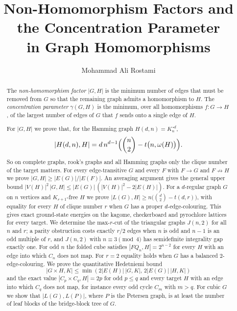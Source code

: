 \documentclass{article}
\title{Non-Homomorphism Factors and the Concentration Parameter\\
       in Graph Homomorphisms}
\author{Mohammad Ali Rostami}
\theoremstyle{definition}
\begin{document}
\maketitle

\begin{abstract}\sloppy
The \emph{non-homomorphism factor} $|G,H|$ is the minimum number of edges that
must be removed from $G$ so that the remaining graph admits a homomorphism to
$H$.  The \emph{concentration parameter} $\gamma(G,H)$ is the minimum, over all
homomorphisms $f\colon G\to H$, of the largest number of edges of $G$ that $f$
sends onto a single edge of $H$.

For $|G,H|$ we prove that, for the Hamming graph $H(d,n)=K_n^{\,\square d}$,
\[|H(d,n),H|=d\,n^{d-1}\Bigl(\binom n2-t\bigl(n,\omega(H)\bigr)\Bigr).\]
So on complete graphs, rook's graphs and all Hamming graphs only the clique
number of the target matters.  For every edge-transitive
$G$ and every $F$ with $F\to G$ and $F\not\to H$ we prove
$|G,H|\ge|E(G)|/|E(F)|$.  An averaging argument gives the general upper bound
$|V(H)|^2\,|G,H|\le|E(G)|\,(|V(H)|^2-2|E(H)|)$.  For a $d$-regular graph $G$ on $n$
vertices and $K_{r+1}$-free $H$ we prove $|L(G),H|\ge n\bigl(\binom d2-t(d,r)\bigr)$,
with equality for every $H$ of clique number $r$ when $G$ has a proper
$d$-edge-colouring.  This gives exact ground-state energies on the kagome,
checkerboard and pyrochlore lattices for every target.  We determine the max-$r$-cut of the triangular graphs $J(n,2)$ for all $n$ and
$r$; a parity obstruction costs exactly $r/2$ edges when $n$ is odd and $n-1$ is an
odd multiple of $r$, and $J(n,2)$ with $n\equiv3\pmod4$ has semidefinite
integrality gap exactly one.  For odd $n$ the folded
cube satisfies $|FQ_n,H|=2^{n-2}$ for every $H$ with an edge into which $C_n$ does
not map.
For $r=2$ equality holds when $G$ has a balanced $2$-edge-colouring.  We prove the quantitative Hedetniemi bound
\[|G\times H,K|\le\min(2|E(H)|\,|G,K|,\,2|E(G)|\,|H,K|)\]
and the exact value $|C_p\times C_q,H|=2p$ for odd $p\le q$ and every target
$H$ with an edge into which $C_q$ does not map, for instance every odd cycle $C_m$
with $m>q$.  For cubic $G$ we show that
$|L(G),L(P)|$, where $P$ is the Petersen graph, is at least the number of leaf
blocks of the bridge-block tree of $G$.


\end{abstract}
\end{document}
